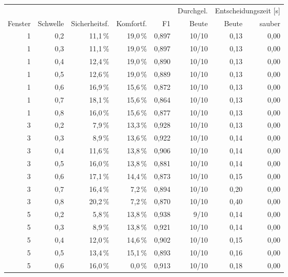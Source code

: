 \begin{table}[H]
    \centering
    \footnotesize
    \renewcommand{\arraystretch}{0.92}
    \begin{tabular}{rrrrrrrr}
        \toprule
        & & & & & Durchgel. & \multicolumn{2}{c}{Entscheidungszeit [s]} \\
        \cmidrule(lr){7-8}
        Fenster & Schwelle & Sicherheitsf. & Komfortf. & F1 & Beute & Beute & sauber \\
        \midrule
        1 & 0,2 & 11,1\,\% & 19,0\,\% & 0,897 & 10/10 & 0,13 & 0,00 \\
        1 & 0,3 & 11,1\,\% & 19,0\,\% & 0,897 & 10/10 & 0,13 & 0,00 \\
        1 & 0,4 & 12,4\,\% & 19,0\,\% & 0,890 & 10/10 & 0,13 & 0,00 \\
        1 & 0,5 & 12,6\,\% & 19,0\,\% & 0,889 & 10/10 & 0,13 & 0,00 \\
        1 & 0,6 & 16,9\,\% & 15,6\,\% & 0,872 & 10/10 & 0,13 & 0,00 \\
        1 & 0,7 & 18,1\,\% & 15,6\,\% & 0,864 & 10/10 & 0,13 & 0,00 \\
        1 & 0,8 & 16,0\,\% & 15,6\,\% & 0,877 & 10/10 & 0,13 & 0,00 \\
        \midrule
        3 & 0,2 & 7,9\,\% & 13,3\,\% & 0,928 & 10/10 & 0,13 & 0,00 \\
        3 & 0,3 & 8,9\,\% & 13,6\,\% & 0,922 & 10/10 & 0,14 & 0,00 \\
        3 & 0,4 & 11,6\,\% & 13,8\,\% & 0,906 & 10/10 & 0,14 & 0,00 \\
        3 & 0,5 & 16,0\,\% & 13,8\,\% & 0,881 & 10/10 & 0,14 & 0,00 \\
        3 & 0,6 & 17,1\,\% & 14,4\,\% & 0,873 & 10/10 & 0,15 & 0,00 \\
        3 & 0,7 & 16,4\,\% & 7,2\,\% & 0,894 & 10/10 & 0,20 & 0,00 \\
        3 & 0,8 & 20,2\,\% & 7,2\,\% & 0,870 & 10/10 & 0,40 & 0,00 \\
        \midrule
        5 & 0,2 & 5,8\,\% & 13,8\,\% & 0,938 & 9/10 & 0,14 & 0,00 \\
        5 & 0,3 & 8,9\,\% & 13,8\,\% & 0,921 & 10/10 & 0,14 & 0,00 \\
        5 & 0,4 & 12,0\,\% & 14,6\,\% & 0,902 & 10/10 & 0,15 & 0,00 \\
        5 & 0,5 & 13,4\,\% & 15,1\,\% & 0,893 & 10/10 & 0,16 & 0,00 \\
        5 & 0,6 & 16,0\,\% & 0,0\,\% & 0,913 & 10/10 & 0,18 & 0,00 \\

\end{tabular}
\end{table}
